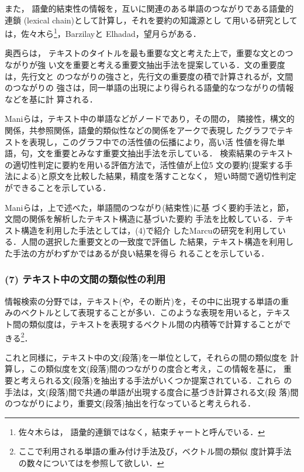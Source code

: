 また，
語彙的結束性の情報を，互いに関連のある単語のつながりである語彙的連鎖
(lexical chain)\cite{morris:91:a}として計算し，それを要約の知識源とし
て用いる研究としては，佐々木ら\cite{sasaki:93:a}\footnote{佐々木らは，
語彙的連鎖ではなく，結束チャートと呼んでいる．}，Barzilayと
Elhadad\cite{barzilay:97:a}，望月ら\cite{mochizuki:98:a}がある．

奥西ら\cite{okunishi:98:a}は，
テキストのタイトルを最も重要な文と考えた上で，重要な文とのつながりが強
い文を重要と考える重要文抽出手法を提案している．文の重要度は，先行文と
のつながりの強さと，先行文の重要度の積で計算されるが，文間のつながりの
強さは，同一単語の出現により得られる語彙的なつながりの情報などを基に計
算される．

Maniら\cite{mani:97:a}は，テキスト中の単語などがノードであり，その間の，
隣接性，構文的関係，共参照関係，語彙的類似性などの関係をアークで表現し
たグラフでテキストを表現し，このグラフ中での活性値の伝播により，高い活
性値を得た単語，句，文を重要とみなす重要文抽出手法を示している．
検索結果のテキストの適切性判定に要約を用いる評価方法で，活性値が上位5
文の要約(提案する手法による)と原文を比較した結果，精度を落すことなく，
短い時間で適切性判定ができることを示している．

Maniら\cite{mani:98:a}は，上で述べた，単語間のつながり(結束性)に基
づく要約手法と，節，文間の関係を解析したテキスト構造に基づいた要約
手法を比較している．テキスト構造を利用した手法としては，(4)で紹介
したMarcuの研究を利用している．人間の選択した重要文との一致度で評価し
た結果，テキスト構造を利用した手法の方がわずかではあるが良い結果を得ら
れることを示している．

\subsubsection{(7) テキスト中の文間の類似性の利用}

情報検索の分野では，テキスト(や，その断片)を，その中に出現する単語の重
みのベクトルとして表現することが多い．このような表現を用いると，テキス
ト間の類似度は，テキストを表現するベクトル間の内積等で計算することがで
きる\footnote{ここで利用される単語の重み付け手法及び，ベクトル間の類似
度計算手法の数々については\cite{salton:89:a}を参照して欲しい．}．

これと同様に，テキスト中の文(段落)を一単位として，それらの間の類似度を
計算し，この類似度を文(段落)間のつながりの度合と考え，この情報を基に，
重要と考えられる文(段落)を抽出する手法がいくつか提案されている．これら
の手法は，文(段落)間で共通の単語が出現する度合に基づき計算される文(段
落)間のつながりにより，重要文(段落)抽出を行なっていると考えられる．

